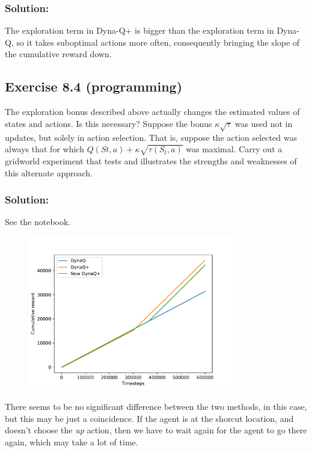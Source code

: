 \subsubsection*{Solution:}
The exploration term in Dyna-Q+ is bigger than the exploration term in Dyna-Q, so it takes
suboptimal actions more often, consequently bringing the slope of the cumulative reward down.

\subsection*{Exercise 8.4 (programming)}
The exploration bonus described above actually changes
the estimated values of states and actions. Is this necessary? Suppose the bonus $\kappa \sqrt{\tau}$
was used not in updates, but solely in action selection. That is, suppose the action
selected was always that for which $Q(S t, a) + \kappa \sqrt{\tau(S_t, a)}$ was maximal. Carry out a
gridworld experiment that tests and illustrates the strengths and weaknesses of this
alternate approach. 

\subsubsection*{Solution:}
See the notebook.

\begin{figure}[H]
    \centering
    \includegraphics[width=0.8\textwidth]{chapters_latex/figures/ex_08_04.pdf}
    \captionsetup{labelformat=empty}
\end{figure}

There seems to be no significant difference between the two methods, in this case, but this may be just a coincidence. If the agent is at the shorcut location, and doesn't choose the \textit{up} action, then we have to wait again for the agent to go there again, which may take a lot of time.

